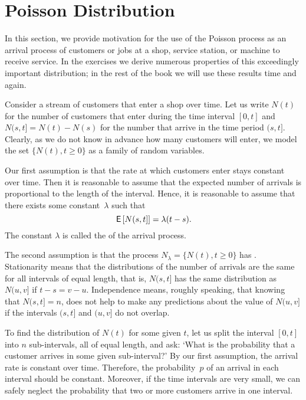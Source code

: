 \section{Poisson Distribution}
\label{sec:poisson-distribution}

In this section, we provide motivation for the use of the Poisson process as an arrival process of customers or jobs at a shop, service station, or machine to receive service. In the exercises we derive numerous properties of this exceedingly important distribution; in the rest of the book we will use these results time and again.




Consider a stream of customers that enter a shop over time.
Let us write $N(t)$ for the number of customers that enter during the time interval $[0,t]$ and $N(s, t] = N(t)-N(s)$ for the number that arrive in the time period $(s, t]$.
Clearly, as we do not know in advance how many customers will enter, we model the set $\{N(t), t\geq 0\}$ as a family of random variables.

Our first assumption is that the rate at which customers enter stays constant over time. Then it is reasonable to assume that
the expected number of arrivals is proportional to the length of
the interval. Hence, it is reasonable to assume that there exists some
constant~$\lambda$ such that
\begin{equation}
 \label{eq:6}
 \,\mathsf{E}\left[N(s,t]\right] = \lambda (t-s).
\end{equation}
The constant $\lambda$ is called the  of the arrival process.


The second assumption is that the process $N_\lambda = \{N(t), t\geq 0\}$ has .
Stationarity means that the distributions of the number of arrivals are the same for all intervals of equal length, that is, 
$N(s,t]$ has the same distribution as $N(u, v]$ if $t-s = v-u$.
Independence means, roughly speaking, that knowing that $N(s,t]= n$, does not help to make any predictions about the value of $N(u, v]$ if the intervals $(s,t]$ and $(u, v]$ do not overlap.



To find the distribution of $N(t)$ for some given $t$, let us split the interval $[0,t]$ into $n$ sub-intervals, all of equal length, and ask: `What is the probability that a customer arrives in some given sub-interval?'
By our first assumption, the arrival rate is constant over time.
Therefore, the probability~$p$ of an arrival in each interval should be constant.
Moreover, if the time intervals are very small, we can safely neglect the probability that two or more customers arrive in one interval.

